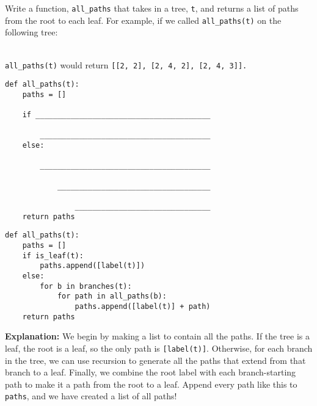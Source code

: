 \begin{blocksection}
\question Write a function, \lstinline$all_paths$ that takes in a tree, \lstinline$t$, and returns a list of paths from the root to each leaf.
For example, if we called \lstinline$all_paths(t)$ on the following tree:

\\\lstinline$all_paths(t)$ would return \lstinline$[[2, 2], [2, 4, 2], [2, 4, 3]].$
\newline

\begin{lstlisting}
def all_paths(t):
    paths = []

    if ________________________________________

        _______________________________________
    else:

        _______________________________________

            ___________________________________
            
                _______________________________
    return paths
\end{lstlisting}

\begin{solution}
\begin{lstlisting}
def all_paths(t):
    paths = []
    if is_leaf(t):
        paths.append([label(t)])
    else:
        for b in branches(t):
            for path in all_paths(b):
                paths.append([label(t)] + path)
    return paths
\end{lstlisting}

\textbf{Explanation:}
\newline
We begin by making a list to contain all the paths.
\newline
If the tree is a leaf, the root is a leaf, so the only path is \lstinline$[label(t)]$.
\newline
Otherwise, for each branch in the tree, we can use recursion to generate all the paths that extend from that branch to a leaf.
\newline
Finally, we combine the root label with each branch-starting path to make it a path from the root to a leaf.
\newline
Append every path like this to \lstinline$paths$, and we have created a list of all paths!
\end{solution}
\end{blocksection}

